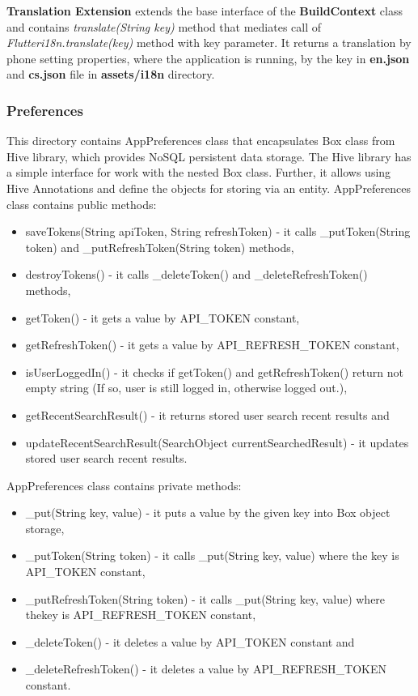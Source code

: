 \textbf{Translation Extension} extends the base interface of the \textbf{BuildContext} class and contains \textit{translate(String key)} method that mediates call of \textit{Flutteri18n.translate(key)} method with key parameter.
It returns a translation by phone setting properties, where the application is running, by the key in  \textbf{en.json} and \textbf{cs.json} file in \textbf{assets/i18n} directory.


\subsubsection{Preferences}\label{subsubsec:preferences}
This directory contains AppPreferences class that encapsulates Box class from Hive library, which provides NoSQL persistent data storage.
The Hive library has a simple interface for work with the nested Box class.
Further, it allows using Hive Annotations and define the objects for storing via an entity.
AppPreferences class contains public methods:
\begin{itemize}
    \item saveTokens(String apiToken, String refreshToken) - it calls \_putToken(String token) and \_putRefreshToken(String token) methods,
    \item destroyTokens() - it calls \_deleteToken() and \_deleteRefreshToken() methods,
    \item getToken() - it gets a value by API\_TOKEN constant,
    \item getRefreshToken() - it gets a value by API\_REFRESH\_TOKEN constant,
    \item isUserLoggedIn() - it checks if getToken() and getRefreshToken() return not empty string (If so, user is still logged in, otherwise logged out.),
    \item getRecentSearchResult() - it returns stored user search recent results and
    \item updateRecentSearchResult(SearchObject currentSearchedResult) - it updates stored user search recent results.
\end{itemize}
AppPreferences class contains private methods:
\begin{itemize}
    \item \_put(String key, value) - it puts a value by the given key into Box object storage,
    \item \_putToken(String token) - it calls \_put(String key, value) where the key is API\_TOKEN constant,
    \item \_putRefreshToken(String token) - it calls \_put(String key, value) where thekey is API\_REFRESH\_TOKEN constant,
    \item \_deleteToken() - it deletes a value by API\_TOKEN constant and
    \item \_deleteRefreshToken() - it deletes a value by API\_REFRESH\_TOKEN constant.
\end{itemize}
